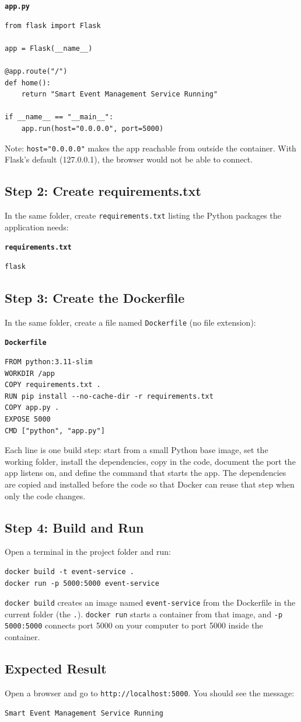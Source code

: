 \documentclass[11pt,a4paper]{article}
\newcommand{\code}[1]{\texttt{#1}}
\newcommand{\labsub}[1]{\subsection*{#1}}
\begin{document}
\textbf{\code{app.py}}
\begin{lstlisting}[style=py]
from flask import Flask

app = Flask(__name__)

@app.route("/")
def home():
    return "Smart Event Management Service Running"

if __name__ == "__main__":
    app.run(host="0.0.0.0", port=5000)
\end{lstlisting}
Note: \code{host="0.0.0.0"} makes the app reachable from outside the container. With Flask's default (127.0.0.1), the browser would not be able to connect.

\labsub{Step 2: Create requirements.txt}
In the same folder, create \code{requirements.txt} listing the Python packages the application needs:

\textbf{\code{requirements.txt}}
\begin{lstlisting}[style=plain]
flask
\end{lstlisting}

\labsub{Step 3: Create the Dockerfile}
In the same folder, create a file named \code{Dockerfile} (no file extension):

\textbf{\code{Dockerfile}}
\begin{lstlisting}[style=plain]
FROM python:3.11-slim
WORKDIR /app
COPY requirements.txt .
RUN pip install --no-cache-dir -r requirements.txt
COPY app.py .
EXPOSE 5000
CMD ["python", "app.py"]
\end{lstlisting}
Each line is one build step: start from a small Python base image, set the working folder, install the dependencies, copy in the code, document the port the app listens on, and define the command that starts the app. The dependencies are copied and installed before the code so that Docker can reuse that step when only the code changes.

\labsub{Step 4: Build and Run}
Open a terminal in the project folder and run:
\begin{lstlisting}[style=plain]
docker build -t event-service .
docker run -p 5000:5000 event-service
\end{lstlisting}
\code{docker build} creates an image named \code{event-service} from the Dockerfile in the current folder (the \code{.}). \code{docker run} starts a container from that image, and \code{-p 5000:5000} connects port 5000 on your computer to port 5000 inside the container.

\labsub{Expected Result}
Open a browser and go to \code{http://localhost:5000}. You should see the message:
\begin{lstlisting}[style=plain]
Smart Event Management Service Running
\end{lstlisting}
\end{document}

